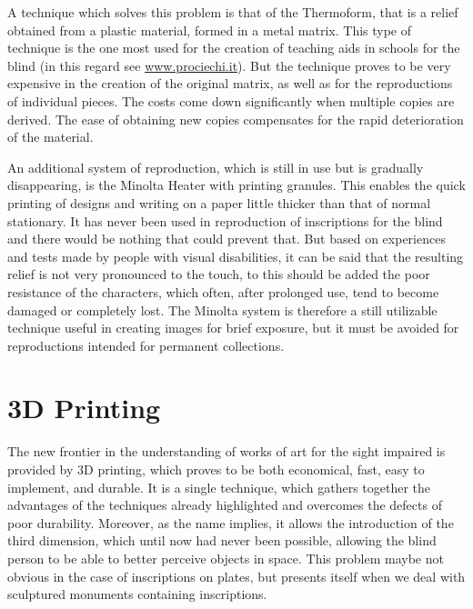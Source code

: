 \documentclass[amsthm,ebook]{saparticle}
\begin{document}
A technique which solves this problem is that of the Thermoform, that is a relief obtained from a plastic material,
formed in a metal matrix. This type of technique is the one most used for the creation of teaching aids in schools for
the blind (in this regard see \url{www.prociechi.it}). But the technique proves to be very expensive in the creation of the
original matrix, as well as for the reproductions of individual pieces. The costs come down significantly when multiple
copies are derived. The ease of obtaining new copies compensates for the rapid deterioration of the material.

An additional system of reproduction, which is still in use but is gradually disappearing, is the Minolta Heater with
printing granules. This enables the quick printing of designs and writing on a paper little thicker than that of normal
stationary. It has never been used in reproduction of inscriptions for the blind and there would be nothing that could
prevent that. But based on experiences and tests made by people with visual disabilities, it can be said that the
resulting relief is not very pronounced to the touch, to this should be added the poor resistance of the characters,
which often, after prolonged use, tend to become damaged or completely lost. The Minolta system is therefore a still
utilizable technique useful in creating images for brief exposure, but it must be avoided for reproductions intended
for permanent collections.






\section{3D Printing}
\noindent The new frontier in the understanding of works of art for the sight impaired is provided by 3D printing, which proves to
be both economical, fast, easy to implement, and durable. It is a single technique, which gathers together the
advantages of the techniques already highlighted and overcomes the defects of poor durability. Moreover, as the name
implies, it allows the introduction of the third dimension, which until now had never been possible, allowing the blind
person to be able to better perceive objects in space. This problem maybe not obvious in the case of inscriptions on
plates, but presents itself when we deal with sculptured monuments containing inscriptions.
\end{document}
